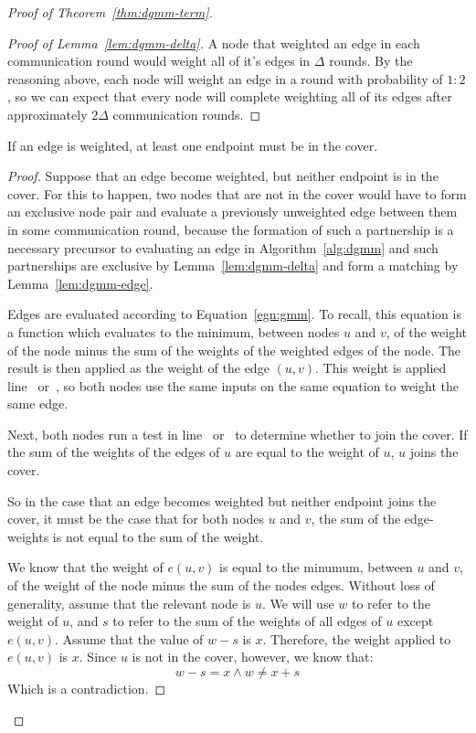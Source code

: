\begin{proof}[Proof of Theorem~\ref{thm:dgmm-term}]
\begin{proof}[Proof of Lemma~\ref{lem:dgmm-delta}]
A node that weighted an edge in each communication round would weight all of it's edges in $\Delta$ rounds. By the reasoning above, each node will weight an edge in a round with probability of $1:2$, so we can expect that every node will complete weighting all of its edges after approximately $2\Delta$ communication rounds.

\end{proof}
\begin{lem}
\label{lem:dgmm-cover}
If an edge is weighted, at least one endpoint must be in the cover.
\end{lem}
\begin{proof}

Suppose that an edge become weighted, but neither endpoint is in the cover. For this to happen, two nodes that are not in the cover would have to form an exclusive node pair and evaluate a previously unweighted edge between them in some communication round, because the formation of such a partnership is a necessary precursor to evaluating an edge in Algorithm~\ref{alg:dgmm} and such partnerships are exclusive by Lemma~\ref{lem:dgmm-delta} and form a matching by Lemma~\ref{lem:dgmm-edge}. 

Edges are evaluated according to Equation~\ref{egn:gmm}. To recall, this equation is a function which evaluates to the minimum, between nodes $u$ and $v$, of the weight of the node minus the sum of the weights of the weighted edges of the node. The result is then applied as the weight of the edge $(u,v)$. This weight is applied line~ or~, so both nodes use the same inputs on the same equation to weight the same edge.

Next, both nodes run a test in line~ or~ to determine whether to join the cover. If the sum of the weights of the edges of $u$ are equal to the weight of $u$, $u$ joins the cover.

So in the case that an edge becomes weighted but neither endpoint joins the cover, it must be the case that for both nodes $u$ and $v$, the sum of the edge-weights is not equal to the sum of the weight.

We know that the weight of $e(u,v)$ is equal to the minumum, between $u$ and $v$, of the weight of the node minus the sum of the nodes edges. Without loss of generality, assume that the relevant node is $u$. We will use $w$ to refer to the weight of $u$, and $s$ to refer to the sum of the weights of all edges of $u$ except $e(u,v)$. Assume that the value of $w - s$ is $x$. Therefore, the weight applied to $e(u,v)$ is $x$. Since $u$ is not in the cover, however, we know that: 
\begin{equation*}
w-s = x \land w \ne x+s
\end{equation*}
Which is a contradiction.


\end{proof}
\end{proof}
